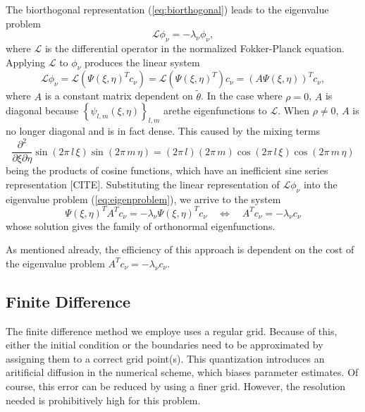 \documentclass[10pt]{article}
\begin{document}
The biorthogonal representation (\ref{eq:biorthogonal}) leads to the
eigenvalue problem
\begin{equation}
  \mathcal{L} \phi_\nu = -\lambda_\nu \phi_\nu, \label{eq:eigenproblem}
\end{equation}
where $\mathcal{L}$ is the differential operator in the normalized
Fokker-Planck equation. Applying $\mathcal{L}$ to $\phi_\nu$ produces
the linear system
\[
  \mathcal{L}\phi_\nu = \mathcal{L}(\Psi(\xi,\eta)^T c_\nu) =
  \mathcal{L}(\Psi(\xi,\eta)^T) c_\nu = (A \Psi(\xi,\eta))^T c_\nu,
\] 
where $A$ is a constant matrix dependent on $\tilde{\theta}$. In the
case where $\rho = 0$, $A$ is diagonal because
$\left\{ \psi_{l,m}(\xi,\eta) \right\}_{l,m}$ arethe eigenfunctions to
$\mathcal{L}$. When $\rho \neq 0$, $A$ is no longer diagonal and is in
fact dense. This caused by the mixing terms
\[
  \frac{\partial^2}{\partial \xi \partial \eta} \sin\left(2\pi\, l\,
    \xi\right) \sin\left(2\pi\, m\, \eta\right) = (2\pi\, l)(2\pi\, m)
  \cos\left(2\pi\, l\, \xi\right) \cos\left(2\pi\, m\, \eta\right)
\]
being the products of cosine functions, which have an inefficient sine
series representation [CITE]. Substituting the linear representation
of $\mathcal{L}\phi_\nu$ into the eigenvalue problem
(\ref{eq:eigenproblem}), we arrive to the system
\[
  \Psi(\xi,\eta)^T A^T c_\nu = -\lambda_\nu \Psi(\xi,\eta)^T c_\nu
  \quad \Leftrightarrow \quad A^T c_\nu = -\lambda_\nu c_\nu
\]
whose solution gives the family of orthonormal eigenfunctions.

As mentioned already, the efficiency of this approach is dependent on
the cost of the eigenvalue problem $A^T c_\nu = -\lambda_\nu c_\nu$. 

\subsection{Finite Difference}
The finite difference method we employe uses a regular grid. Because
of this, either the initial condition or the boundaries need to be
approximated by assigning them to a correct grid point(s). This
quantization introduces an aritificial diffusion in the numerical
scheme, which biases parameter estimates. Of course, this error can be
reduced by using a finer grid. However, the resolution needed is
prohibitively high for this problem.
\end{document}
